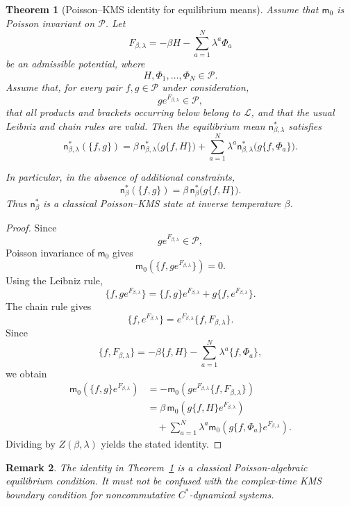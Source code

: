 \documentclass[11pt,reqno]{amsart}
\newtheorem{Theorem}{Theorem}[section]
\newtheorem{rem}[Theorem]{Remark}
\begin{document}
\begin{Theorem}[Poisson--KMS identity for equilibrium means]
\label{thm:poisson-kms}
Assume that $\mathsf m_0$ is Poisson invariant on $\mathcal P$. Let
\[
F_{\beta,\lambda}
=
-\beta H-\sum_{a=1}^{N}\lambda^a\Phi_a
\]
be an admissible potential, where
\[
H,\Phi_1,\ldots,\Phi_N\in\mathcal P.
\]
Assume that, for every pair $f,g\in\mathcal P$ under consideration,
\[
ge^{F_{\beta,\lambda}}\in\mathcal P,
\]
that all products and brackets occurring below belong to $\mathcal L$,
and that the usual Leibniz and chain rules are valid. Then the
equilibrium mean $\mathsf n_{\beta,\lambda}^*$ satisfies
\[
\mathsf n_{\beta,\lambda}^*(\{f,g\})
=
\beta\,
\mathsf n_{\beta,\lambda}^*
\bigl(g\{f,H\}\bigr)
+
\sum_{a=1}^{N}\lambda^a
\mathsf n_{\beta,\lambda}^*
\bigl(g\{f,\Phi_a\}\bigr).
\]

In particular, in the absence of additional constraints,
\[
\mathsf n_{\beta}^*(\{f,g\})
=
\beta\,
\mathsf n_{\beta}^*
\bigl(g\{f,H\}\bigr).
\]
Thus $\mathsf n_\beta^*$ is a classical Poisson--KMS state at inverse
temperature $\beta$.
\end{Theorem}

\begin{proof}
Since
\[
ge^{F_{\beta,\lambda}}\in\mathcal P,
\]
Poisson invariance of $\mathsf m_0$ gives
\[
\mathsf m_0\left(
\{f,ge^{F_{\beta,\lambda}}\}
\right)
=
0.
\]
Using the Leibniz rule,
\[
\{f,ge^{F_{\beta,\lambda}}\}
=
\{f,g\}e^{F_{\beta,\lambda}}
+
g\{f,e^{F_{\beta,\lambda}}\}.
\]
The chain rule gives
\[
\{f,e^{F_{\beta,\lambda}}\}
=
e^{F_{\beta,\lambda}}
\{f,F_{\beta,\lambda}\}.
\]
Since
\[
\{f,F_{\beta,\lambda}\}
=
-\beta\{f,H\}
-
\sum_{a=1}^{N}\lambda^a\{f,\Phi_a\},
\]
we obtain
\begin{align*}
\mathsf m_0\left(
\{f,g\}e^{F_{\beta,\lambda}}
\right)
&=
-\mathsf m_0\left(
g e^{F_{\beta,\lambda}}
\{f,F_{\beta,\lambda}\}
\right)
\\
&=
\beta\,
\mathsf m_0\left(
g\{f,H\}e^{F_{\beta,\lambda}}
\right)
\\
&\quad+
\sum_{a=1}^{N}\lambda^a
\mathsf m_0\left(
g\{f,\Phi_a\}e^{F_{\beta,\lambda}}
\right).
\end{align*}
Dividing by $Z(\beta,\lambda)$ yields the stated identity.
\end{proof}

\begin{rem}
The identity in Theorem~\ref{thm:poisson-kms} is a classical
Poisson-algebraic equilibrium condition. It must not be confused with
the complex-time KMS boundary condition for noncommutative
$C^*$-dynamical systems.
\end{rem}
\end{document}
